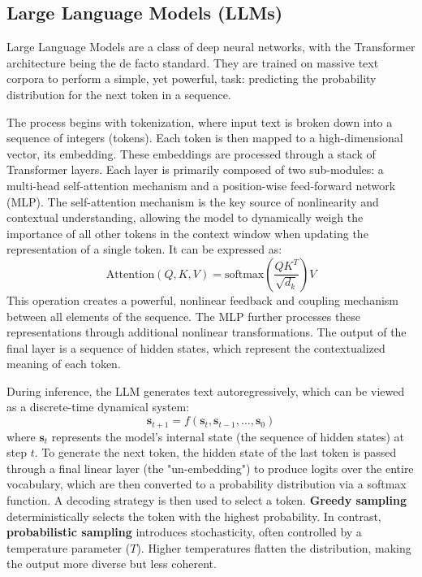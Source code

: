 \documentclass[a4paper,12pt]{article}
\begin{document}
\subsection{Large Language Models (LLMs)}
Large Language Models are a class of deep neural networks, with the Transformer architecture being the de facto standard. They are trained on massive text corpora to perform a simple, yet powerful, task: predicting the probability distribution for the next token in a sequence.

The process begins with tokenization, where input text is broken down into a sequence of integers (tokens). Each token is then mapped to a high-dimensional vector, its embedding. These embeddings are processed through a stack of Transformer layers. Each layer is primarily composed of two sub-modules: a multi-head self-attention mechanism and a position-wise feed-forward network (MLP). The self-attention mechanism is the key source of nonlinearity and contextual understanding, allowing the model to dynamically weigh the importance of all other tokens in the context window when updating the representation of a single token. It can be expressed as:
\begin{equation}
    \text{Attention}(Q, K, V) = \text{softmax}\left(\frac{QK^T}{\sqrt{d_k}}\right)V
\end{equation}
This operation creates a powerful, nonlinear feedback and coupling mechanism between all elements of the sequence. The MLP further processes these representations through additional nonlinear transformations. The output of the final layer is a sequence of hidden states, which represent the contextualized meaning of each token.

During inference, the LLM generates text autoregressively, which can be viewed as a discrete-time dynamical system:
\begin{equation}
    \mathbf{s}_{t+1} = f(\mathbf{s}_t, \mathbf{s}_{t-1}, ..., \mathbf{s}_0)
\end{equation}
where $\mathbf{s}_t$ represents the model's internal state (the sequence of hidden states) at step $t$. To generate the next token, the hidden state of the last token is passed through a final linear layer (the "un-embedding") to produce logits over the entire vocabulary, which are then converted to a probability distribution via a softmax function. A decoding strategy is then used to select a token. \textbf{Greedy sampling} deterministically selects the token with the highest probability. In contrast, \textbf{probabilistic sampling} introduces stochasticity, often controlled by a temperature parameter ($T$). Higher temperatures flatten the distribution, making the output more diverse but less coherent.
\end{document}
